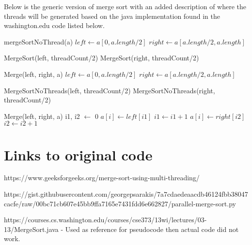 \documentclass{article}
\begin{document}
Below is the generic version of merge sort with an added description of where the threads will be generated based on the java implementation found in the washington.edu code listed below.

\begin{algorithm}
\begin{algorithmic}
			\State mergeSortNoThread(a)
			\State $left \gets a[0, a.length/2]$
			\State $right \gets a[a.length/2, a.length]$
			
			\State MergeSort(left, threadCount/2) 
			\State MergeSort(right, threadCount/2) 
			
			\State Merge(left, right, a)
		\EndIf
	\EndProcedure
			\State $left \gets a[0, a.length/2]$
			\State $right \gets a[a.length/2, a.length]$
			
			\State MergeSortNoThreads(left, threadCount/2)
			\State MergeSortNoThreads(right, threadCount/2) 
			
			\State Merge(left, right, a)
		\EndIf
	\EndProcedure
	\State i1, i2 $\gets$ 0
			\State $a[i] \gets left[i1] $
			\State $i1 \gets i1 + 1$
		\Else
			\State $a[i] \gets right[i2]$
			\State $i2 \gets i2+1$
		\EndIf
	\EndFor
	\EndProcedure
\end{algorithmic}
\end{algorithm}

\section{Links to original code}

https://www.geeksforgeeks.org/merge-sort-using-multi-threading/\newline

https://gist.githubusercontent.com/georgepsarakis/7a7cdaedeaacdb46124fbb38047cacfe/raw/00bc71cb607e45bb9ffa7165e7431fdd6e662827/parallel-merge-sort.py\newline

https://courses.cs.washington.edu/courses/cse373/13wi/lectures/03-13/MergeSort.java - Used as reference for pseudocode then actual code did not work.
\end{document}
